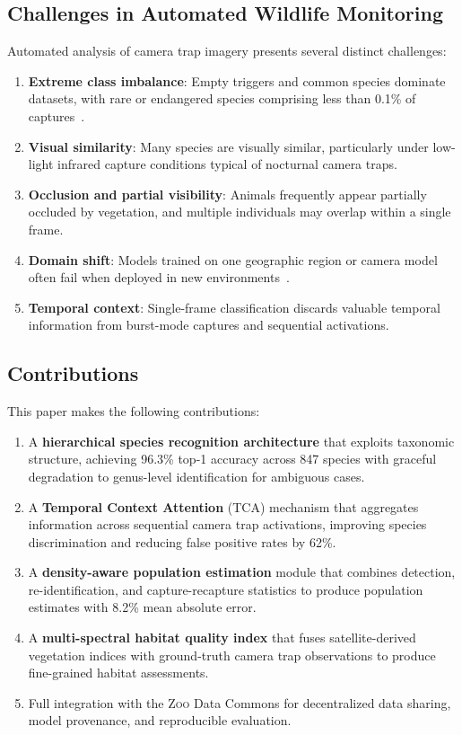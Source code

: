 \documentclass[11pt,letterpaper]{article}
\newcommand{\Zoo}{\textsc{Zoo}}
\begin{document}
\subsection{Challenges in Automated Wildlife Monitoring}

Automated analysis of camera trap imagery presents several distinct challenges:

\begin{enumerate}[leftmargin=*]
    \item \textbf{Extreme class imbalance}: Empty triggers and common species dominate datasets, with rare or endangered species comprising less than 0.1\% of captures~\cite{beery2019}.
    \item \textbf{Visual similarity}: Many species are visually similar, particularly under low-light infrared capture conditions typical of nocturnal camera traps.
    \item \textbf{Occlusion and partial visibility}: Animals frequently appear partially occluded by vegetation, and multiple individuals may overlap within a single frame.
    \item \textbf{Domain shift}: Models trained on one geographic region or camera model often fail when deployed in new environments~\cite{beery2018}.
    \item \textbf{Temporal context}: Single-frame classification discards valuable temporal information from burst-mode captures and sequential activations.
\end{enumerate}

\subsection{Contributions}

This paper makes the following contributions:

\begin{enumerate}[leftmargin=*]
    \item A \textbf{hierarchical species recognition architecture} that exploits taxonomic structure, achieving 96.3\% top-1 accuracy across 847 species with graceful degradation to genus-level identification for ambiguous cases.
    \item A \textbf{Temporal Context Attention} (TCA) mechanism that aggregates information across sequential camera trap activations, improving species discrimination and reducing false positive rates by 62\%.
    \item A \textbf{density-aware population estimation} module that combines detection, re-identification, and capture-recapture statistics to produce population estimates with 8.2\% mean absolute error.
    \item A \textbf{multi-spectral habitat quality index} that fuses satellite-derived vegetation indices with ground-truth camera trap observations to produce fine-grained habitat assessments.
    \item Full integration with the \Zoo{} Data Commons for decentralized data sharing, model provenance, and reproducible evaluation.
\end{enumerate}
\end{document}
